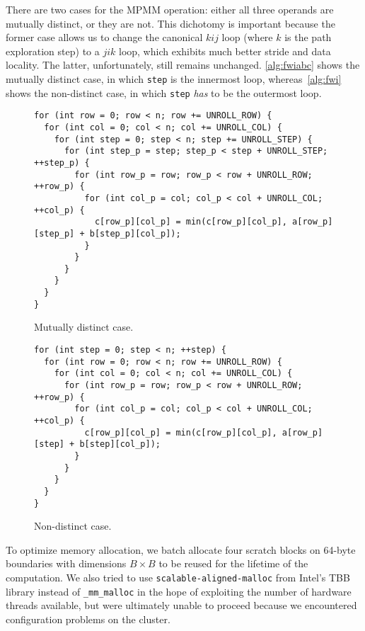 \documentclass{scrartcl}
\begin{document}
  There are two cases for the MPMM operation: either all three operands are mutually distinct, or they are not. This dichotomy is important because the former case allows us to change the canonical $kij$ loop (where $k$ is the path exploration step) to a $jik$ loop, which exhibits much better stride and data locality. The latter, unfortunately, still remains unchanged. \autoref{alg:fwiabc} shows the mutually distinct case, in which \texttt{step} is the innermost loop, whereas~\autoref{alg:fwi} shows the non-distinct case, in which \texttt{step} \emph{has} to be the outermost loop.

  \begin{figure}[ht!]
    \begin{lstlisting}
for (int row = 0; row < n; row += UNROLL_ROW) {
  for (int col = 0; col < n; col += UNROLL_COL) {
    for (int step = 0; step < n; step += UNROLL_STEP) {
      for (int step_p = step; step_p < step + UNROLL_STEP; ++step_p) {
        for (int row_p = row; row_p < row + UNROLL_ROW; ++row_p) {
          for (int col_p = col; col_p < col + UNROLL_COL; ++col_p) {
            c[row_p][col_p] = min(c[row_p][col_p], a[row_p][step_p] + b[step_p][col_p]);
          }
        }
      }
    }
  }
}
    \end{lstlisting}
    \caption{Mutually distinct case.\label{alg:fwiabc}}
  \end{figure}

  \begin{figure}[ht!]
    \begin{lstlisting}
for (int step = 0; step < n; ++step) {
  for (int row = 0; row < n; row += UNROLL_ROW) {
    for (int col = 0; col < n; col += UNROLL_COL) {
      for (int row_p = row; row_p < row + UNROLL_ROW; ++row_p) {
        for (int col_p = col; col_p < col + UNROLL_COL; ++col_p) {
          c[row_p][col_p] = min(c[row_p][col_p], a[row_p][step] + b[step][col_p]);
        }
      }
    }
  }
}
    \end{lstlisting}
    \caption{Non-distinct case.\label{alg:fwiabc}}
  \end{figure}

  To optimize memory allocation, we batch allocate four scratch blocks on 64-byte boundaries with dimensions $B \times B$ to be reused for the lifetime of the computation. We also tried to use \texttt{scalable-aligned-malloc} from Intel's TBB library instead of \texttt{\_mm\_malloc} in the hope of exploiting the number of hardware threads available, but were ultimately unable to proceed because we encountered configuration problems on the cluster.
\end{document}
